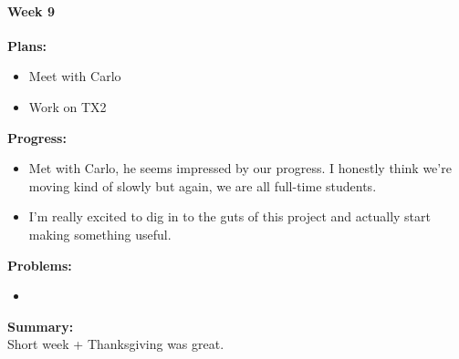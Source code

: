 \paragraph{Week 9}
\begin{adjustwidth}{2.5em}{0pt}
    \vspace{-0.5cm}\textbf{Plans:}
    \vspace{-0.5cm}
    \begin{itemize}
        \item Meet with Carlo
        \item Work on TX2
    \end{itemize} 
    \vspace{-0.3cm}\textbf{Progress:}
    \vspace{-0.5cm}
    \begin{itemize}
        \item Met with Carlo, he seems impressed by our progress. I honestly think we're moving kind of slowly but again, we are all full-time students. 
        \item I'm really excited to dig in to the guts of this project and actually start making something useful.
    \end{itemize} 
    \vspace{-0.3cm}\textbf{Problems:}
    \vspace{-0.5cm}
    \begin{itemize}
        \item 
    \end{itemize}  
    \vspace{-0.3cm}\noindent\textbf{Summary:}\\
    \noindent 
    Short week + Thanksgiving was great.
\end{adjustwidth} 

